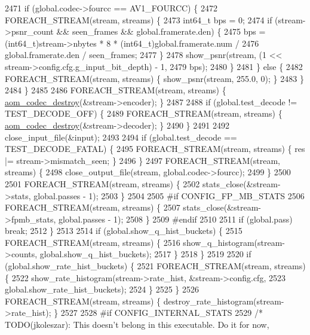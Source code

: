 \begin{DoxyCodeInclude}
{{{{{{{{{{{{{{{{{{{{{{{{{{{{{{{{{{{{{{{{{{{{{{{{{{{{{{{{{{{{{2471       \textcolor{keywordflow}{if} (global.codec->fourcc == AV1\_FOURCC) \{
2472         FOREACH\_STREAM(stream, streams) \{
2473           int64\_t bps = 0;
2474           \textcolor{keywordflow}{if} (stream->psnr\_count && seen\_frames && global.framerate.den) \{
2475             bps = (int64\_t)stream->nbytes * 8 * (int64\_t)global.framerate.num /
2476                   global.framerate.den / seen\_frames;
2477           \}
2478           show\_psnr(stream, (1 << stream->config.cfg.g\_input\_bit\_depth) - 1,
2479                     bps);
2480         \}
2481       \} \textcolor{keywordflow}{else} \{
2482         FOREACH\_STREAM(stream, streams) \{ show\_psnr(stream, 255.0, 0); \}
2483       \}
2484     \}
2485 
2486     FOREACH\_STREAM(stream, streams) \{ \hyperlink{group__codec_ga9b60e186f61ba2d6ab2b8069b76a15c5}{aom\_codec\_destroy}(&stream->encoder); \}
2487 
2488     \textcolor{keywordflow}{if} (global.test\_decode != TEST\_DECODE\_OFF) \{
2489       FOREACH\_STREAM(stream, streams) \{ \hyperlink{group__codec_ga9b60e186f61ba2d6ab2b8069b76a15c5}{aom\_codec\_destroy}(&stream->decoder); \}
2490     \}
2491 
2492     close\_input\_file(&input);
2493 
2494     \textcolor{keywordflow}{if} (global.test\_decode == TEST\_DECODE\_FATAL) \{
2495       FOREACH\_STREAM(stream, streams) \{ res |= stream->mismatch\_seen; \}
2496     \}
2497     FOREACH\_STREAM(stream, streams) \{
2498       close\_output\_file(stream, global.codec->fourcc);
2499     \}
2500 
2501     FOREACH\_STREAM(stream, streams) \{
2502       stats\_close(&stream->stats, global.passes - 1);
2503     \}
2504 
2505 \textcolor{preprocessor}{#if CONFIG\_FP\_MB\_STATS}
2506     FOREACH\_STREAM(stream, streams) \{
2507       stats\_close(&stream->fpmb\_stats, global.passes - 1);
2508     \}
2509 \textcolor{preprocessor}{#endif}
2510 
2511     \textcolor{keywordflow}{if} (global.pass) \textcolor{keywordflow}{break};
2512   \}
2513 
2514   \textcolor{keywordflow}{if} (global.show\_q\_hist\_buckets) \{
2515     FOREACH\_STREAM(stream, streams) \{
2516       show\_q\_histogram(stream->counts, global.show\_q\_hist\_buckets);
2517     \}
2518   \}
2519 
2520   \textcolor{keywordflow}{if} (global.show\_rate\_hist\_buckets) \{
2521     FOREACH\_STREAM(stream, streams) \{
2522       show\_rate\_histogram(stream->rate\_hist, &stream->config.cfg,
2523                           global.show\_rate\_hist\_buckets);
2524     \}
2525   \}
2526   FOREACH\_STREAM(stream, streams) \{ destroy\_rate\_histogram(stream->rate\_hist); \}
2527 
2528 \textcolor{preprocessor}{#if CONFIG\_INTERNAL\_STATS}
2529   \textcolor{comment}{/* TODO(jkoleszar): This doesn't belong in this executable. Do it for now,}
}}}}}}}}}}}}}}}}}}}}}}}}}}}}}}}}}}}}}}}}}}}}}}}}}}}}}}}}}}}}}
\end{DoxyCodeInclude}
